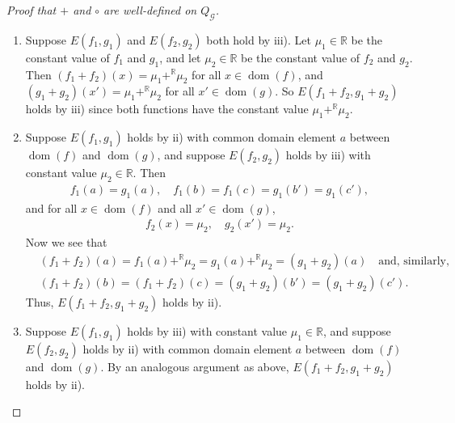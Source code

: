 \documentclass{scrartcl}
\DeclareMathOperator{\dom}{dom}
\newcommand{\SG}{\mathscr{G}}
\newcommand{\BR}{\mathbb{R}}
\begin{document}
\begin{proof}[Proof that $+$ and $\circ$ are well-defined on $Q_{\SG}$]
\begin{enumerate}[(1)]
Suppose instead that the element in common between $\dom(f_1)$ and $\dom(g_1)$ is the same element that is in common between $\dom(f_2)$ and $\dom(g_2)$. Call this element $a$ in either case, and let $\dom(f)=\{a,b,c\}$ and $\dom(g)=\{a,b',c'\}$. Now we have the following equations by ii):
\begin{align*}
&f_1(a)=g_1(a),\quad f_1(b)=f_1(c)=g_1(b')=g_1(c'),\quad\text{and}\\
&f_2(a)=g_2(a),\quad f_2(b)=f_2(c)=g_2(b')=g_2(c').
\end{align*}
Now we can see that the functions $f_1+f_2$ and $g_1+g_2$ act similarly to one another on their domains:
\begin{align*}
&(f_1+f_2)(a)=f_1(a)+^{\BR}f_2(a)=g_1(a)+^{\BR}g_2(a)=(g_1+g_2)(a),\quad\text{and similarly,}\\
&(f_1+f_2)(b)=(f_1+f_2)(c)=(g_1+g_2)(b')=(g_1+g_2)(c').
\end{align*}

In fact, this shows that $E(f_1+f_2,g_1+g_2)$ holds by ii).

\item Suppose $E(f_1,g_1)$ and $E(f_2,g_2)$ both hold by iii). Let $\mu_1\in\BR$ be the constant value of $f_1$ and $g_1$, and let $\mu_2\in\BR$ be the constant value of $f_2$ and $g_2$. Then $(f_1+f_2)(x)=\mu_1+^{\BR}\mu_2$ for all $x\in\dom(f)$, and $(g_1+g_2)(x')=\mu_1+^{\BR}\mu_2$ for all $x'\in\dom(g)$. So $E(f_1+f_2,g_1+g_2)$ holds by iii) since both functions have the constant value $\mu_1+^{\BR}\mu_2$.

\item Suppose $E(f_1,g_1)$ holds by ii) with common domain element $a$ between $\dom(f)$ and $\dom(g)$, and suppose $E(f_2,g_2)$ holds by iii) with constant value $\mu_2\in\BR$. Then 
\begin{align*}
f_1(a)=g_1(a),\quad f_1(b)=f_1(c)=g_1(b')=g_1(c'),
\end{align*}
and for all $x\in\dom(f)$ and all $x'\in\dom(g)$,
\begin{align*}
f_2(x)=\mu_2, \quad g_2(x')=\mu_2.
\end{align*}
Now we see that
\begin{align*}
&(f_1+f_2)(a)=f_1(a)+^{\BR}\mu_2=g_1(a)+^{\BR}\mu_2=(g_1+g_2)(a)\quad\text{and, similarly,}\\
&(f_1+f_2)(b)=(f_1+f_2)(c)=(g_1+g_2)(b')=(g_1+g_2)(c').
\end{align*}
Thus, $E(f_1+f_2,g_1+g_2)$ holds by ii).

\item Suppose $E(f_1,g_1)$ holds by iii) with constant value $\mu_1\in\BR$, and suppose $E(f_2,g_2)$ holds by ii) with common domain element $a$  between $\dom(f)$ and $\dom(g)$. By an analogous argument as above, $E(f_1+f_2,g_1+g_2)$ holds by ii).
\end{enumerate}
\end{proof}
\end{document}
